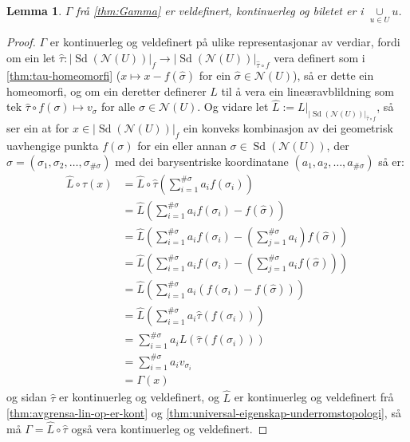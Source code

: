 \documentclass[a4paper, 12pt, norsk]{article}
\theoremstyle{plain}
\newtheorem{lemma}[theorem]{Lemma}
\theoremstyle{definition}
\newcommand{\Nc}{\mathcal{N}}
\newcommand{\union}{ \mathop{\cup}\limits }
\newcommand{\gr}[1]{ \lvert #1 \rvert } %
\newcommand{\tuple}[1]{ \left( #1 \right) } %
\DeclareMathOperator{\Sd}{Sd} %
\begin{document}
\begin{lemma} \label{thm:Gamma-eigenskapar}
	\( \Gamma \) frå \autoref{thm:Gamma} er veldefinert, kontinuerleg og biletet er i \( \union_{u\in U} u \).
\end{lemma}

\begin{proof}
	\( \Gamma \) er kontinuerleg og veldefinert på ulike representasjonar av verdiar, fordi om ein let \( \hat{\tau} : \gr{\Sd(\Nc(U))}_f \to \gr{\Sd(\Nc(U))}_{\hat{\tau} \circ f} \) vera definert som i \autoref{thm:tau-homeomorfi} (\( x \mapsto x - f(\hat{\sigma}) \) for ein \( \hat{\sigma} \in \Nc(U) \)), så er dette ein homeomorfi, og om ein deretter definerer \( L \) til å vera ein lineæravblildning som tek \( \hat{\tau} \circ f (\sigma) \mapsto v_{\sigma} \) for alle \( \sigma \in \Nc(U) \). Og vidare let \( \hat{L} := L|_{\gr{\Sd(\Nc(U))}_{\hat{\tau}\circ f}} \), så ser ein at for \( x \in \gr{\Sd(\Nc(U))}_f \) ein konveks kombinasjon av dei geometrisk uavhengige punkta \( f(\sigma) \) for ein eller annan \( \sigma \in \Sd(\Nc(U)) \), der \( \sigma = \tuple{\sigma_1, \sigma_2, \dots, \sigma_{\#\sigma}} \) med dei barysentriske koordinatane \( \tuple{a_1, a_2, \dots, a_{\#\sigma}} \) så er:
	\begin{align*}
		\hat{L} \circ \hat{\tau} (x) &= \hat{L} \circ \hat{\tau} \tuple{\sum_{i=1}^{\#\sigma}a_i f(\sigma_i)} \\
		&= \hat{L} \tuple{\sum_{i=1}^{\#\sigma}a_i f(\sigma_i)-f(\hat{\sigma})} \\
		&= \hat{L} \tuple{\sum_{i=1}^{\#\sigma}a_i f(\sigma_i)-\tuple{\sum_{j=1}^{\#\sigma}a_i}f(\hat{\sigma})} \\
		&= \hat{L} \tuple{\sum_{i=1}^{\#\sigma}a_i f(\sigma_i)-\tuple{\sum_{j=1}^{\#\sigma}a_if(\hat{\sigma})}} \\
		&= \hat{L} \tuple{\sum_{i=1}^{\#\sigma}a_i\tuple{f(\sigma_i)-f(\hat{\sigma})}} \\
		&= \hat{L} \tuple{\sum_{i=1}^{\#\sigma}a_i\hat{\tau}\tuple{f(\sigma_i)}} \\
		&= \sum_{i=1}^{\#\sigma}a_iL\tuple{\hat{\tau}\tuple{f(\sigma_i)}} \\
		&= \sum_{i=1}^{\#\sigma}a_i v_{\sigma_i} \\
		&= \Gamma(x)
	\end{align*}
	og sidan \( \hat{\tau} \) er kontinuerleg og veldefinert, og \( \hat{L} \) er kontinuerleg og veldefinert frå \autoref{thm:avgrensa-lin-op-er-kont} og \autoref{thm:universal-eigenskap-underromstopologi}, så må \( \Gamma = \hat{L}\circ\hat{\tau} \) også vera kontinuerleg og veldefinert.


\end{proof}
\end{document}

